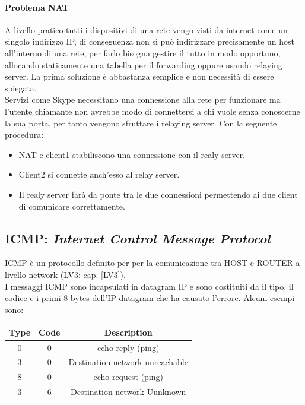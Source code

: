 \documentclass[12pt]{article}
\begin{document}
\paragraph{Problema NAT} A livello pratico tutti i dispositivi di una rete vengo visti da internet come un singolo indirizzo IP, di conseguenza non si può indirizzare precisamente un host all'interno di una rete, per farlo bisogna gestire il tutto in modo opportuno, allocando staticamente una tabella per il forwarding oppure usando relaying server.
La prima soluzione è abbastanza semplice e non necessità di essere spiegata.\\
Servizi come Skype necessitano una connessione alla rete per funzionare ma l'utente chiamante non avrebbe modo di connettersi a chi vuole senza conoscerne la sua porta, per tanto vengono sfruttare i relaying server. Con la seguente procedura:
\begin{itemize}
  \item NAT e client1 stabiliscono una connessione con il realy server.
  \item Client2 si connette anch'esso al relay server.
  \item Il realy server farà da ponte tra le due connessioni permettendo ai due client di comunicare correttamente.
\end{itemize}

\subsection{ICMP: \textit{Internet Control Message Protocol}}
ICMP è un protocollo definito per per la comunicazione tra HOST e ROUTER a livello network (LV3: cap. \ref{LV3}).\\
I messaggi ICMP sono incapsulati in datagram IP e sono costituiti da il tipo, il codice e i primi 8 bytes dell'IP datagram che ha causato l'errore. Alcuni esempi sono:
\begin{center}
\begin{tabular}{ |c|c|c| }
 \hline
 \textbf{Type} & \textbf{Code} & \textbf{Description} \\
 \hline
 \hline
 0 & 0 & echo reply (ping) \\
 \hline
 3 & 0 & Destination network unreachable \\
 \hline
 8 & 0 & echo request (ping) \\
 \hline
 3 & 6 & Destination network Uunknown \\
 \hline
\end{tabular}
\end{center}
\end{document}
